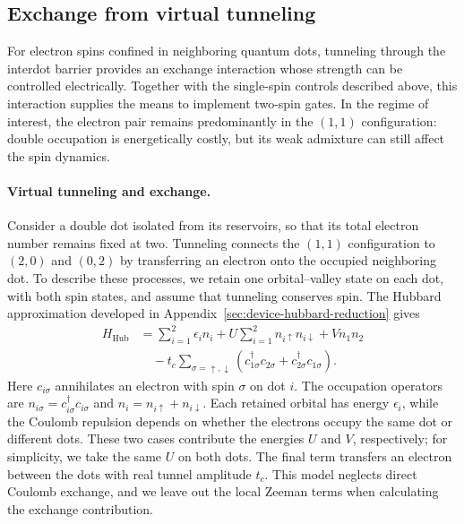 \subsection{Exchange from virtual tunneling}
\label{sec:exchange-virtual-tunneling}

For electron spins confined in neighboring quantum dots, tunneling
through the interdot barrier provides an exchange interaction whose
strength can be controlled electrically. Together with the single-spin
controls described above, this interaction supplies the means to
implement two-spin gates. In the regime of interest, the electron
pair remains predominantly in the $(1,1)$ configuration: double occupation is energetically
costly, but its weak admixture can still affect the spin dynamics.

\paragraph{Virtual tunneling and exchange.}
Consider a double dot isolated from its reservoirs, so that its total
electron number remains fixed at two. Tunneling connects the $(1,1)$
configuration to $(2,0)$ and $(0,2)$ by transferring an electron onto
the occupied neighboring dot. To describe these processes, we retain
one orbital--valley state on each dot, with both spin states, and
assume that tunneling conserves spin. The Hubbard approximation
developed in Appendix~\ref{sec:device-hubbard-reduction} gives
\begin{equation}
  \begin{aligned}
    H_{\mathrm{Hub}}
      &=\sum_{i=1}^2\epsilon_i n_i
        +U\sum_{i=1}^2 n_{i\uparrow}n_{i\downarrow}+Vn_1n_2\\
      &\quad-t_c\sum_{\sigma=\uparrow,\downarrow}
        (c_{1\sigma}^\dagger c_{2\sigma}
         +c_{2\sigma}^\dagger c_{1\sigma}).
  \end{aligned}
  \label{eq:two-site-hubbard}
\end{equation}
Here $c_{i\sigma}$ annihilates an electron with spin $\sigma$ on
dot $i$. The occupation operators are
$n_{i\sigma}=c_{i\sigma}^\dagger c_{i\sigma}$ and
$n_i=n_{i\uparrow}+n_{i\downarrow}$.
Each retained orbital has energy $\epsilon_i$, while the Coulomb
repulsion depends on whether the electrons occupy the same dot or
different dots. These two cases contribute the energies $U$ and $V$,
respectively; for simplicity, we take the same $U$ on both dots.
The final term transfers an electron between the dots with real
tunnel amplitude $t_c$. This model neglects direct Coulomb exchange,
and we leave out the local Zeeman terms when calculating the exchange
contribution.

